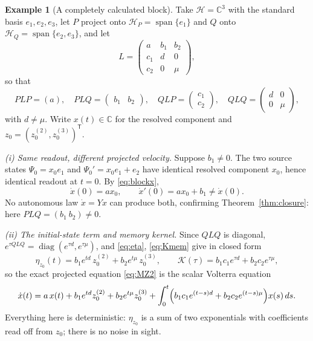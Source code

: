 \documentclass[11pt,reqno]{amsart}
\numberwithin{equation}{section}
\theoremstyle{plain}
\theoremstyle{definition}
\newtheorem{example}[theorem]{Example}
\theoremstyle{remark}
\newcommand{\HP}{\mathcal{H}_{P}}
\newcommand{\HQ}{\mathcal{H}_{Q}}
\newcommand{\Kmem}{\mathcal{K}}
\DeclareMathOperator{\spanset}{span}
\begin{document}
\begin{example}[A completely calculated block]
\label{ex:block}
Take $\mathcal{H}=\mathbb{C}^{3}$ with the standard basis $e_{1},e_{2},e_{3}$, let $P$
project onto $\HP=\spanset\{e_{1}\}$ and $Q$ onto $\HQ=\spanset\{e_{2},e_{3}\}$, and let
\[
L=\begin{pmatrix} a & b_{1} & b_{2}\\ c_{1} & d & 0\\ c_{2} & 0 & \mu\end{pmatrix},
\]
so that
\[
PLP=(a),\quad
PLQ=\begin{pmatrix}b_{1}&b_{2}\end{pmatrix},\quad
QLP=\begin{pmatrix}c_{1}\\ c_{2}\end{pmatrix},\quad
QLQ=\begin{pmatrix}d&0\\0&\mu\end{pmatrix},
\]
with $d\neq\mu$. Write $x(t)\in\mathbb{C}$ for the resolved component and
$z_{0}=(z_{0}^{(2)},z_{0}^{(3)})^{\mathsf T}$.

\smallskip
\noindent\emph{(i) Same readout, different projected velocity.} Suppose $b_{1}\neq0$. The
two source states $\Psi_{0}=x_{0}e_{1}$ and $\Psi_{0}'=x_{0}e_{1}+e_{2}$ have identical
resolved component $x_{0}$, hence identical readout at $t=0$. By \eqref{eq:blockx},
\[
\dot x(0)=a x_{0},
\qquad
\dot x'(0)=a x_{0}+b_{1}\neq\dot x(0).
\]
No autonomous law $\dot x=Yx$ can produce both, confirming Theorem~\ref{thm:closure}: here
$PLQ=(b_{1}\ b_{2})\neq0$.

\smallskip
\noindent\emph{(ii) The initial-state term and memory kernel.} Since $QLQ$ is diagonal,
$e^{\tau QLQ}=\operatorname{diag}(e^{\tau d},e^{\tau\mu})$, and \eqref{eq:eta},
\eqref{eq:Kmem} give in closed form
\[
\eta_{z_{0}}(t)=b_{1}e^{td}\,z_{0}^{(2)}+b_{2}e^{t\mu}\,z_{0}^{(3)},
\qquad
\Kmem(\tau)=b_{1}c_{1}e^{\tau d}+b_{2}c_{2}e^{\tau\mu},
\]
so the exact projected equation \eqref{eq:MZ2} is the scalar Volterra equation
\[
\dot x(t)=a\,x(t)
+b_{1}e^{td}z_{0}^{(2)}+b_{2}e^{t\mu}z_{0}^{(3)}
+\int_{0}^{t}\Bigl(b_{1}c_{1}e^{(t-s)d}+b_{2}c_{2}e^{(t-s)\mu}\Bigr)x(s)\,ds .
\]
Everything here is deterministic: $\eta_{z_{0}}$ is a sum of two exponentials with
coefficients read off from $z_{0}$; there is no noise in sight.


\end{example}
\end{document}
